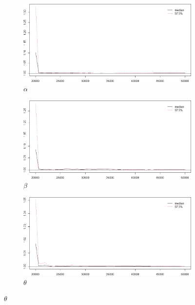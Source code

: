 \documentclass{Class/julia}
\begin{document}
\begin{figure}[!ht]
    \centering
    \caption{PSRF Values (Gelman--Rubin Diagnostic)}
    \label{fig:5}
    \begin{subfigure}{0.45\textwidth}
        \centering
        \includegraphics[width=\textwidth]{rytgaard1990/gelman_alpha.png}
        \caption{\( \alpha \)}
    \end{subfigure}
    \hfill
    \begin{subfigure}{0.45\textwidth}
        \centering
        \includegraphics[width=\textwidth]{rytgaard1990/gelman_beta.png}
        \caption{\( \beta \)}
    \end{subfigure}

    \vspace{1em}

    \begin{subfigure}{0.45\textwidth}
        \centering
        \includegraphics[width=\textwidth]{rytgaard1990/gelman_theta.png}
        \caption{\( \theta \)}
    \end{subfigure}
\end{figure}
\end{document}
